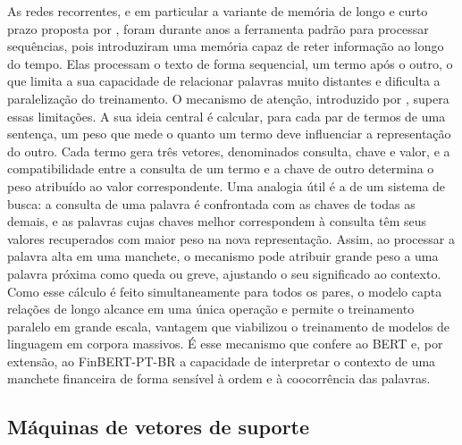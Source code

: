 As redes recorrentes, e em particular a variante de memória de longo e curto prazo proposta por , foram durante anos a ferramenta padrão para processar sequências, pois introduziram uma memória capaz de reter informação ao longo do tempo. Elas processam o texto de forma sequencial, um termo após o outro, o que limita a sua capacidade de relacionar palavras muito distantes e dificulta a paralelização do treinamento. O mecanismo de atenção, introduzido por , supera essas limitações. A sua ideia central é calcular, para cada par de termos de uma sentença, um peso que mede o quanto um termo deve influenciar a representação do outro. Cada termo gera três vetores, denominados consulta, chave e valor, e a compatibilidade entre a consulta de um termo e a chave de outro determina o peso atribuído ao valor correspondente. Uma analogia útil é a de um sistema de busca: a consulta de uma palavra é confrontada com as chaves de todas as demais, e as palavras cujas chaves melhor correspondem à consulta têm seus valores recuperados com maior peso na nova representação. Assim, ao processar a palavra alta em uma manchete, o mecanismo pode atribuir grande peso a uma palavra próxima como queda ou greve, ajustando o seu significado ao contexto. Como esse cálculo é feito simultaneamente para todos os pares, o modelo capta relações de longo alcance em uma única operação e permite o treinamento paralelo em grande escala, vantagem que viabilizou o treinamento de modelos de linguagem em corpora massivos. É esse mecanismo que confere ao BERT \cite{devlin_bert_2019} e, por extensão, ao FinBERT-PT-BR a capacidade de interpretar o contexto de uma manchete financeira de forma sensível à ordem e à coocorrência das palavras.

\subsection{Máquinas de vetores de suporte}

